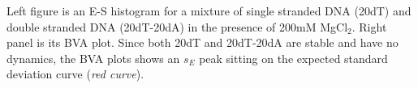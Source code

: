\label{fig:bva_static}  Left figure is an E-S histogram for a mixture of single stranded DNA (20dT) and double stranded DNA (20dT-20dA) in the presence of 200mM MgCl$_2$. Right panel is its BVA plot. Since both 20dT and 20dT-20dA are stable and have no dynamics, the BVA plots shows an $s_E$ peak sitting on the expected standard deviation curve (\textit{red curve}).